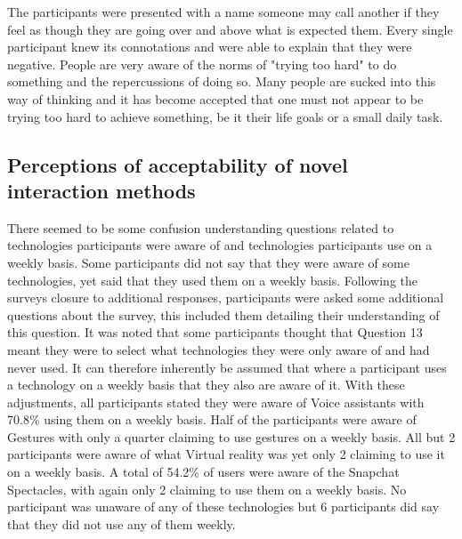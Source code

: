 \documentclass{l4proj}
\begin{document}
The participants were presented with a name someone may call another if they feel as though they are going over and above what is expected them. Every single participant knew its connotations and were able to explain that they were negative. People are very aware of the norms of "trying too hard" to do something and the repercussions of doing so. Many people are sucked into this way of thinking and it has become accepted that one must not appear to be trying too hard to achieve something, be it their life goals or a small daily task.

\subsection{Perceptions of acceptability of novel interaction methods}

There seemed to be some confusion understanding questions related to technologies participants were aware of and technologies participants use on a weekly basis. Some participants did not say that they were aware of some technologies, yet said that they used them on a weekly basis. Following the surveys closure to additional responses, participants were asked some additional questions about the survey, this included them detailing their understanding of this question. It was noted that some participants thought that Question 13 meant they were to select what technologies they were only aware of and had never used. It can therefore inherently be assumed that where a participant uses a technology on a weekly basis that they also are aware of it. With these adjustments, all participants stated they were aware of Voice assistants with 70.8\% using them on a weekly basis. Half of the participants were aware of Gestures with only a quarter claiming to use gestures on a weekly basis. All but 2 participants were aware of what Virtual reality was yet only 2 claiming to use it on a weekly basis. A total of 54.2\% of users were aware of the Snapchat Spectacles, with again only 2 claiming to use them on a weekly basis. No participant was unaware of any of these technologies but 6 participants did say that they did not use any of them weekly.
\end{document}
